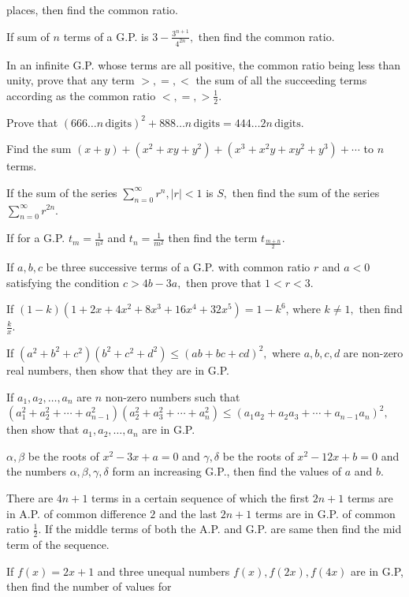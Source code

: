  places, then find the common ratio.
\item If sum of $n$ terms of a G.P. is $3 - \frac{3^{n + 1}}{4^{2n}},$ then find the common ratio.
\item In an infinite G.P. whose terms are all positive, the common ratio being less than unity, prove that any term $>, =,
  <$ the sum of all the succeeding terms according as the common ratio $<, =, > \frac{1}{2}$.
\item Prove that $(666\ldots n\,\text{digits})^2 + 888\ldots n\,\text{digits} = 444\ldots 2n\,\text{digits}$.
\item Find the sum $(x + y) + (x^2 + xy + y^2) + (x^3 + x^2y + xy^2 + y^3) + \cdots$ to $n$ terms.
\item If the sum of the series $\displaystyle\sum_{n = 0}^\infty r^n, |r| < 1$ is $S,$ then find the sum of the series $\displaystyle\sum_{n=0}^\infty
  r^{2n}$.
\item If for a G.P. $t_m = \frac{1}{n^2}$ and $t_n = \frac{1}{m^2}$ then find the term $t_{\tfrac{m + n}{2}}$.
\item If $a, b, c$ be three successive terms of a G.P. with common ratio $r$ and $a < 0$ satisfying the condition $c > 4b
  - 3a,$ then prove that $1 < r < 3$.
\item If $(1 - k)(1 + 2x + 4x^2 + 8x^3 + 16x^4 + 32x^5) = 1 - k^6$, where $k \neq 1,$ then find $\frac{k}{x}$.
\item If $(a^2 + b^2 + c^2)(b^2 + c^2 + d^2) \leq (ab + bc + cd)^2,$ where $a, b, c, d$ are non-zero real numbers, then
  show that they are in G.P.
\item If $a_1, a_2, \ldots, a_n$ are $n$ non-zero numbers such that $(a_1^2 + a_2^2 + \cdots + a_{n - 1}^2)(a_2^2 + a_3^2
  + \cdots + a_n^2) \leq (a_1a_2 + a_2a_3 + \cdots + a_{n - 1}a_n)^2,$ then show that $a_1, a_2, \ldots, a_n$ are in G.P.
\item $\alpha, \beta$ be the roots of $x^2 - 3x + a = 0$ and $\gamma, \delta$ be the roots of $x^2 - 12x + b = 0$ and the
  numbers $\alpha, \beta, \gamma, \delta$ form an increasing G.P., then find the values of $a$ and $b$.
\item There are $4n + 1$ terms in a certain sequence of which the first $2n + 1$ terms are in A.P. of common difference
  $2$ and the last $2n + 1$ terms are in G.P. of common ratio $\frac{1}{2}.$ If the middle terms of both the A.P. and G.P. are same
  then find the mid term of the sequence.
\item If $f(x) = 2x + 1$ and three unequal numbers $f(x), f(2x), f(4x)$ are in G.P, then find the number of values for
